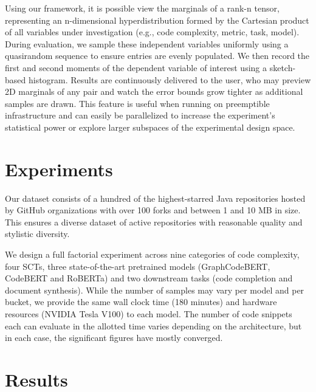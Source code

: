 \documentclass[usenames,dvipsnames]{article} %
\begin{document}
Using our framework, it is possible view the marginals of a rank-n tensor, representing an n-dimensional hyperdistribution formed by the Cartesian product of all variables under investigation (e.g., code complexity, metric, task, model). During evaluation, we sample these independent variables uniformly using a quasirandom sequence to ensure entries are evenly populated. We then record the first and second moments of the dependent variable of interest using a sketch-based histogram. Results are continuously delivered to the user, who may preview 2D marginals of any pair and watch the error bounds grow tighter as additional samples are drawn. This feature is useful when running on preemptible infrastructure and can easily be parallelized to increase the experiment's statistical power or explore larger subspaces of the experimental design space.

\section{Experiments}\label{sec:experiments}

Our dataset consists of a hundred of the highest-starred Java repositories hosted by GitHub organizations with over 100 forks and between 1 and 10 MB in size. This ensures a diverse dataset of active repositories with reasonable quality and stylistic diversity.

We design a full factorial experiment across nine categories of code complexity, four SCTs, three state-of-the-art pretrained models (GraphCodeBERT, CodeBERT and RoBERTa) and two downstream tasks (code completion and document synthesis). While the number of samples may vary per model and per bucket, we provide the same wall clock time (180 minutes) and hardware resources (NVIDIA Tesla V100) to each model. The number of code snippets each can evaluate in the allotted time varies depending on the architecture, but in each case, the significant figures have mostly converged.

\pagebreak\section{Results}\label{sec:results}
\end{document}
